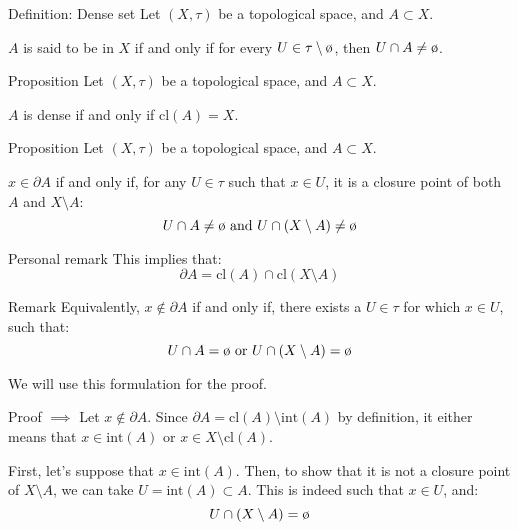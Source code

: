 \documentclass[a4paper]{article}
\begin{document}
\begin{parag}{Definition: Dense set}
    Let $\left(X, \tau\right)$ be a topological space, and $A \subset X$.

    $A$ is said to be  in $X$ if and only if for every $U \in \tau \setminus \o$, then $U \cap A \neq \o$.
\end{parag}

\begin{parag}{Proposition}
    Let $\left(X, \tau\right)$ be a topological space, and $A \subset X$. 

    $A$ is dense if and only if $\text{cl}\left(A\right) = X$.
\end{parag}

\begin{parag}{Proposition}
    Let $\left(X, \tau\right)$ be a topological space, and $A \subset X$.

    $x \in \partial A$ if and only if, for any $U \in \tau$ such that $x \in U$, it is a closure point of both $A$ and $X \setminus A$: 
    \[U \cap A \neq \o \text{ and } U \cap \left(X \setminus A\right) \neq \o\]

    \begin{subparag}{Personal remark}
        This implies that: 
        \[\partial A = \text{cl}\left(A\right) \cap \text{cl}\left(X \setminus A\right)\]
    \end{subparag}

    \begin{subparag}{Remark}
        Equivalently, $x \not \in \partial A$ if and only if, there exists a $U \in \tau$ for which $x \in U$, such that: 
        \[U \cap A = \o \text{ or } U \cap \left(X \setminus A\right) = \o\]

        We will use this formulation for the proof.
    \end{subparag}

    \begin{subparag}{Proof $\implies$}
        Let $x \not \in \partial A$. Since $\partial A = \text{cl}\left(A\right) \setminus \text{int}\left(A\right)$ by definition, it either means that $x \in \text{int}\left(A\right)$ or $x \in X \setminus \text{cl}\left(A\right)$.

        First, let's suppose that $x \in \text{int}\left(A\right)$. Then, to show that it is not a closure point of $X \setminus A$, we can take $U = \text{int}\left(A\right) \subset A$. This is indeed such that $x \in U$, and: 
        \[U \cap \left(X \setminus A\right) = \o\]
        

\end{subparag}
\end{parag}
\end{document}
